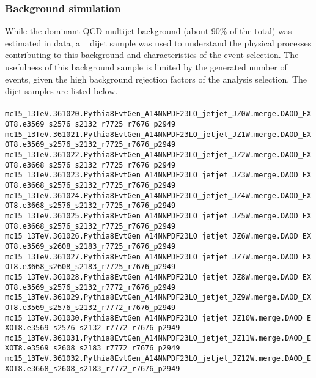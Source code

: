 \clearpage
\subsubsection{Background simulation}
While the dominant QCD multijet background (about 90\% of the total) was estimated in data, a \Pythia~\cite{pythia8} dijet sample was used to understand the physical processes contributing to this background and characteristics of the event selection. The usefulness of this background sample is limited by the generated number of events, given the high background rejection factors of the analysis selection. The dijet samples are listed below.
\\ \\
\noindent
{\scriptsize
\verb|mc15_13TeV.361020.Pythia8EvtGen_A14NNPDF23LO_jetjet_JZ0W.merge.DAOD_EXOT8.e3569_s2576_s2132_r7725_r7676_p2949|\\
\verb|mc15_13TeV.361021.Pythia8EvtGen_A14NNPDF23LO_jetjet_JZ1W.merge.DAOD_EXOT8.e3569_s2576_s2132_r7725_r7676_p2949|\\
\verb|mc15_13TeV.361022.Pythia8EvtGen_A14NNPDF23LO_jetjet_JZ2W.merge.DAOD_EXOT8.e3668_s2576_s2132_r7725_r7676_p2949|\\
\verb|mc15_13TeV.361023.Pythia8EvtGen_A14NNPDF23LO_jetjet_JZ3W.merge.DAOD_EXOT8.e3668_s2576_s2132_r7725_r7676_p2949|\\
\verb|mc15_13TeV.361024.Pythia8EvtGen_A14NNPDF23LO_jetjet_JZ4W.merge.DAOD_EXOT8.e3668_s2576_s2132_r7725_r7676_p2949|\\
\verb|mc15_13TeV.361025.Pythia8EvtGen_A14NNPDF23LO_jetjet_JZ5W.merge.DAOD_EXOT8.e3668_s2576_s2132_r7725_r7676_p2949|\\
\verb|mc15_13TeV.361026.Pythia8EvtGen_A14NNPDF23LO_jetjet_JZ6W.merge.DAOD_EXOT8.e3569_s2608_s2183_r7725_r7676_p2949|\\
\verb|mc15_13TeV.361027.Pythia8EvtGen_A14NNPDF23LO_jetjet_JZ7W.merge.DAOD_EXOT8.e3668_s2608_s2183_r7725_r7676_p2949|\\
\verb|mc15_13TeV.361028.Pythia8EvtGen_A14NNPDF23LO_jetjet_JZ8W.merge.DAOD_EXOT8.e3569_s2576_s2132_r7772_r7676_p2949|\\
\verb|mc15_13TeV.361029.Pythia8EvtGen_A14NNPDF23LO_jetjet_JZ9W.merge.DAOD_EXOT8.e3569_s2576_s2132_r7772_r7676_p2949|\\
\verb|mc15_13TeV.361030.Pythia8EvtGen_A14NNPDF23LO_jetjet_JZ10W.merge.DAOD_EXOT8.e3569_s2576_s2132_r7772_r7676_p2949|\\
\verb|mc15_13TeV.361031.Pythia8EvtGen_A14NNPDF23LO_jetjet_JZ11W.merge.DAOD_EXOT8.e3569_s2608_s2183_r7772_r7676_p2949|\\
\verb|mc15_13TeV.361032.Pythia8EvtGen_A14NNPDF23LO_jetjet_JZ12W.merge.DAOD_EXOT8.e3668_s2608_s2183_r7772_r7676_p2949|
}

